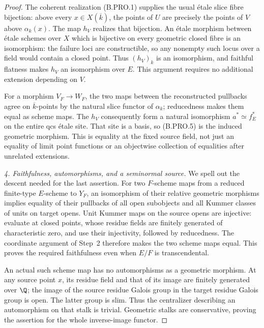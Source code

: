 \begin{proof}
The coherent realization (B.PRO.1) supplies the usual étale
slice fibre bijection: above every \(x\in X(\overline k)\),
the points of \(U\) are precisely the points of \(V\) above
\(\alpha_k(x)\). The map \(h_V\) realizes that bijection.
An étale morphism between étale schemes over \(X\) which is
bijective on every geometric closed fibre is an isomorphism:
the failure loci are constructible, so any nonempty such locus
over a field would contain a closed point. Thus \((h_V)_k\)
is an isomorphism, and faithful flatness makes \(h_V\) an
isomorphism over \(E\). This argument requires no additional
extension depending on \(V\).

For a morphism \(V_F\to W_F\), the two maps between the
reconstructed pullbacks agree on \(\overline k\)-points by
the natural slice functor of \(\alpha_k\); reducedness makes
them equal as scheme maps. The \(h_V\) consequently form a
natural isomorphism \(a^*\simeq f_E^*\) on the entire qcs
étale site. That site is a basis, so (B.PRO.5) is the induced
geometric morphism. This is equality at the fixed source field,
not just an equality of limit point functions or an objectwise
collection of equalities after unrelated extensions.

\emph{4. Faithfulness, automorphisms, and a seminormal source.}
We spell out the descent needed for the last assertion. For two
\(F\)-scheme maps from a reduced finite-type \(E\)-scheme to
\(Y_F\), an isomorphism of their relative geometric morphisms
implies equality of their pullbacks of all open subobjects and
all Kummer classes of units on target opens. Unit Kummer maps
on the source opens are injective: evaluate at closed points,
whose residue fields are finitely generated of characteristic
zero, and use their injectivity, followed by reducedness.
The coordinate argument of Step~2 therefore makes the two
scheme maps equal. This proves the required faithfulness even
when \(E/F\) is transcendental.

An actual such scheme map has no automorphisms as a geometric
morphism. At any source point \(x\), its residue field and
that of its image are finitely generated over \(\Q\); the
image of the source residue Galois group in the target residue
Galois group is open. The latter group is slim. Thus the
centralizer describing an automorphism on that stalk is trivial.
Geometric stalks are conservative, proving the assertion for
the whole inverse-image functor.


\end{proof}
